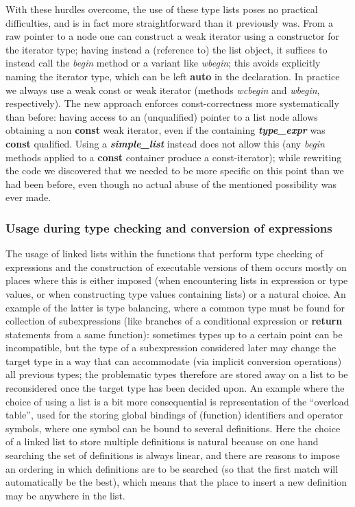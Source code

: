\documentclass[12pt]{article}
\theoremstyle{plain}
\theoremstyle{definition}
\def\smpl.{\textbf{\textit{simple\_\!list}}}
\def\tpex.{\textbf{\textit{type\_\!expr}}}
\begin{document}
With these hurdles overcome, the use of these type lists poses no practical
difficulties, and is in fact more straightforward than it previously was. From a
raw pointer to a node one can construct a weak iterator using a constructor for
the iterator type; having instead a (reference to) the list object, it suffices
to instead call the \textit{begin} method or a variant like \textit{wbegin};
this avoids explicitly naming the iterator type, which can be left \textbf{auto}
in the declaration. In practice we always use a weak const or weak iterator
(methods \textit{wcbegin} and \textit{wbegin}, respectively). The new approach
enforces const-correctness more systematically than before: having access to an
(unqualified) pointer to a list node allows obtaining a non \textbf{const} weak
iterator, even if the containing \tpex. was \textbf{const} qualified. Using a
\smpl. instead does not allow this (any \textit{begin} methods applied to a
\textbf{const} container produce a const-iterator); while rewriting the code we
discovered that we needed to be more specific on this point than we had been
before, even though no actual abuse of the mentioned possibility was ever made.

\subsubsection{Usage during type checking and conversion of expressions}

The usage of linked lists within the functions that perform type checking of
expressions and the construction of executable versions of them occurs mostly on
places where this is either imposed (when encountering lists in expression or
type values, or when constructing type values containing lists) or a natural
choice. An example of the latter is type balancing, where a common type must be
found for collection of subexpressions (like branches of a conditional
expression or \textbf{return} statements from a same function): sometimes types
up to a certain point can be incompatible, but the type of a subexpression
considered later may change the target type in a way that can accommodate (via
implicit conversion operations) all previous types; the problematic types
therefore are stored away on a list to be reconsidered once the target type has
been decided upon. An example where the choice of using a list is a bit more
consequential is representation of the ``overload table'', used for the storing
global bindings of (function) identifiers and operator symbols, where one symbol
can be bound to several definitions. Here the choice of a linked list to store
multiple definitions is natural because on one hand searching the set of
definitions is always linear, and there are reasons to impose an ordering in
which definitions are to be searched (so that the first match will automatically
be the best), which means that the place to insert a new definition may be
anywhere in the list.
\end{document}
